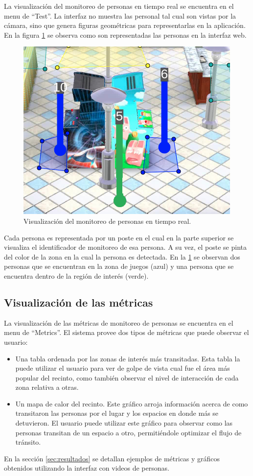 La visualización del monitoreo de personas en tiempo real se encuentra en el menu de ``Test''. La interfaz no muestra las personal tal cual son vistas por la cámara, sino que genera figuras geométricas para representarlas en la aplicación. En la figura \ref{fig:visualizacionSeguimiento} se observa como son representadas las personas en la interfaz web.

\begin{figure}[ht]
	\centering
	\includegraphics[scale=.8]{./Figures/visualizacionSeguimiento.png}
	\caption{Visualización del monitoreo de personas en tiempo real.}
	\label{fig:visualizacionSeguimiento}
\end{figure}

Cada persona es representada por un poste en el cual en la parte superior se visualiza el identificador de monitoreo de esa persona. A su vez, el poste se pinta del color de la zona en la cual la persona es detectada. En la \ref{fig:visualizacionSeguimiento} se observan dos personas que se encuentran en la zona de juegos (azul) y una persona que se encuentra dentro de la región de interés (verde).

\subsection{Visualización de las métricas}

La visualización de las métricas de monitoreo de personas se encuentra en el menu de ``Metrics''. El sistema provee dos tipos de métricas que puede observar el usuario:

\begin{itemize}
\item Una tabla ordenada por las zonas de interés más transitadas. Esta tabla la puede utilizar el usuario para ver de golpe de vista cual fue el área más popular del recinto, como también observar el nivel de interacción de cada zona relativa a otras.
\item Un mapa de calor del recinto. Este gráfico arroja información acerca de como transitaron las personas por el lugar y los espacios en donde más se detuvieron. El usuario puede utilizar este gráfico para observar como las personas transitan de un espacio a otro, permitiéndole optimizar el flujo de tránsito.
\end{itemize}

En la sección \ref{sec:resultados} se detallan ejemplos de métricas y gráficos obtenidos utilizando la interfaz con videos de personas.